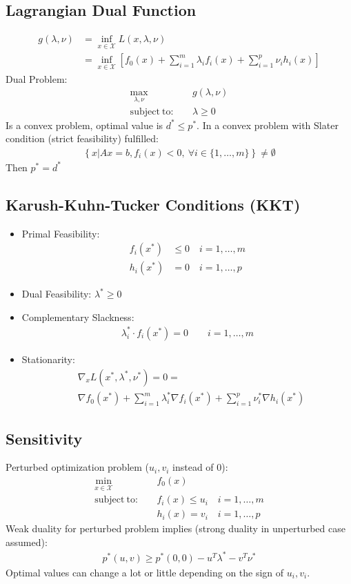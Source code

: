 \documentclass[a4paper,landscape,8pt,fleqn]{scrartcl}
\newcommand{\mc}[1]{\mathcal{#1}}
\begin{document}
\begin{multicols}{3}
\subsection{Lagrangian Dual Function}
\begin{align*}
	g(\lambda,\nu) &= \inf_{x \in \mc{X}} L(x,\lambda,\nu) \\
	&= \inf_{x \in \mc{X}} \left[ f_0(x)+\sum_{i=1}^{m}\lambda_i f_i(x)+\sum_{i=1}^{p}\nu_i h_i(x)\right]
\end{align*}
Dual Problem:
\begin{align*}
	\max_{\lambda,\nu} & \quad g(\lambda,\nu)\\
	\mathrm{subject~to:}&\quad \lambda \geq 0
\end{align*}
Is a convex problem, optimal value is $d^* \leq p^*$. In a convex problem with Slater condition (strict feasibility) fulfilled:
\begin{align*}
	\left\{x \left| \right. Ax=b, f_i(x)<0, ~\forall i \in \{ 1,\dots,m\} \right\} \neq \emptyset
\end{align*}
Then $p^* = d^*$
\subsection{Karush-Kuhn-Tucker Conditions (KKT)}
\begin{itemize}
	\item Primal Feasibility:
		\begin{align*}
			f_i(x^*) &\leq 0 \quad i=1,\dots,m\\
			h_i(x^*) &=0 \quad i=1,\dots,p
		\end{align*}
	\item Dual Feasibility:  $\lambda^* \geq 0$
	\item Complementary Slackness:
		\begin{align*}
			\lambda_i^* \cdot f_i(x^*) = 0 \quad \quad i=1,\dots,m
		\end{align*}
	\item Stationarity:
		\begin{align*}
			&\nabla_x L(x^*,\lambda^*,\nu^*) =0 =\\ &\nabla f_0(x^*) + \sum_{i=1}^m\lambda_i^*\nabla f_i(x^*)+  \sum_{i=1}^p\nu_i^*\nabla h_i(x^*)
		\end{align*}
\end{itemize}
\subsection{Sensitivity}
Perturbed optimization problem ($u_i,v_i$ instead of $0$):
\begin{align*}
	\min_{x \in \mc{X}} & \quad f_0(x)\\
	\mathrm{subject~to:} & \quad f_i(x)\leq u_i \quad i=1,\dots,m \\
	& \quad h_i(x)=v_i \quad i=1,\dots,p
\end{align*}
Weak duality for perturbed problem implies (strong duality in unperturbed case assumed):
\begin{align*}
	p^*(u,v) \geq p^*(0,0) - u^T\lambda^* - v^T \nu^*
\end{align*}
Optimal values can change a lot or little depending on the sign of $u_i,v_i$.

\end{multicols}
\end{document}
